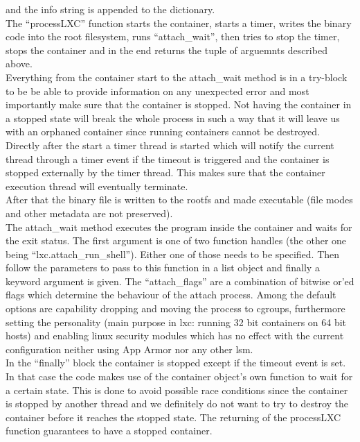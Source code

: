 and the info string is appended to the dictionary.\\
The ``processLXC'' function starts the container, starts a timer, writes the binary code into the root filesystem, runs
``attach\_wait'', then tries to stop the timer, stops the container and in the end returns the tuple of arguemnts
described above.\\
Everything from the container start to the attach\_wait method is in a try-block to be be able to provide information on
any unexpected error and most importantly make sure that the container is stopped. Not having the container in a stopped
state will break the whole process in such a way that it will leave us with an orphaned container since running containers
cannot be destroyed.\\
Directly after the start a timer thread is started which will notify the current thread through a timer event if the
timeout is triggered and the container is stopped externally by the timer thread. This makes sure that the container
execution thread will eventually terminate.\\
After that the binary file is written to the rootfs and made executable (file modes and other metadata are not preserved).\\
The attach\_wait method executes the program inside the container and waits for the exit status. The first argument is
one of two function handles (the other one being ``lxc.attach\_run\_shell''). Either one of those needs to be specified. Then
follow the parameters to pass to this function in a list object and finally a keyword argument is given. The
``attach\_flags'' are a combination of bitwise or'ed flags which determine the behaviour of the attach process. Among
the default options are capability dropping and moving the process to cgroups, furthermore setting the personality
(main purpose in lxc: running 32 bit containers on 64 bit hosts)\cite{personality} and enabling linux security modules
which has no effect with the current configuration neither using App Armor nor any other lsm.\\
In the ``finally'' block the container is stopped except if the timeout event is set. In that case the code makes use of
the container object's own function to wait for a certain state. This is done to avoid possible race conditions since
the container is stopped by another thread and we definitely do not want to try to destroy the container before it
reaches the stopped state. The returning of the processLXC function guarantees to have a stopped container.

